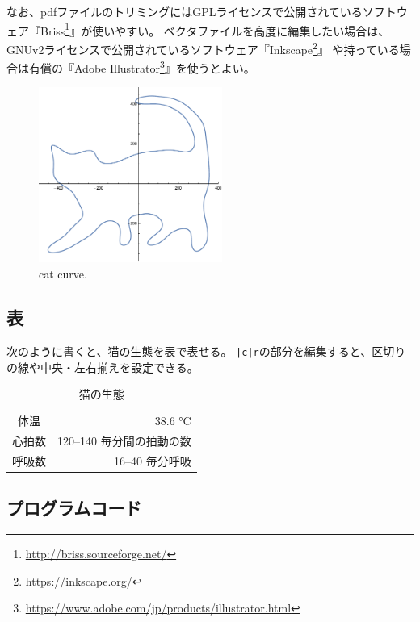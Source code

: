 \documentclass[uplatex, a4paper,twocolumn, 14pt]{jsarticle}
\begin{document}
なお、pdfファイルのトリミングにはGPLライセンスで公開されているソフトウェア『Briss\footnote{\url{http://briss.sourceforge.net/}}』が使いやすい。
ベクタファイルを高度に編集したい場合は、GNUv2ライセンスで公開されているソフトウェア『Inkscape\footnote{\url{https://inkscape.org/}}』
や持っている場合は有償の『Adobe Illustrator\footnote{\url{https://www.adobe.com/jp/products/illustrator.html}}』を使うとよい。

\begin{figure}[tbh]
    \begin{center}
        \includegraphics[width=6cm]{graphics/cat_curve.pdf}
        \caption{
            cat curve.
        }
        \label{graph:cat_curve}
    \end{center}
\end{figure}

\subsection{表}
次のように書くと、猫の生態を表で表せる。
\lstinline{|c|r}の部分を編集すると、区切りの線や中央・左右揃えを設定できる。

\begin{table}[tbh]
    \begin{center}
        \begin{tabular}{|c|r}
            体温 & 38.6 °C \\
            心拍数 & 120–140 毎分間の拍動の数 \\
            呼吸数 & 16–40 毎分呼吸
        \end{tabular}
        \caption{猫の生態\cite{kahn2007merck}}
        \label{tab:table-name}
    \end{center}
\end{table}

\subsection{プログラムコード}
\end{document}
